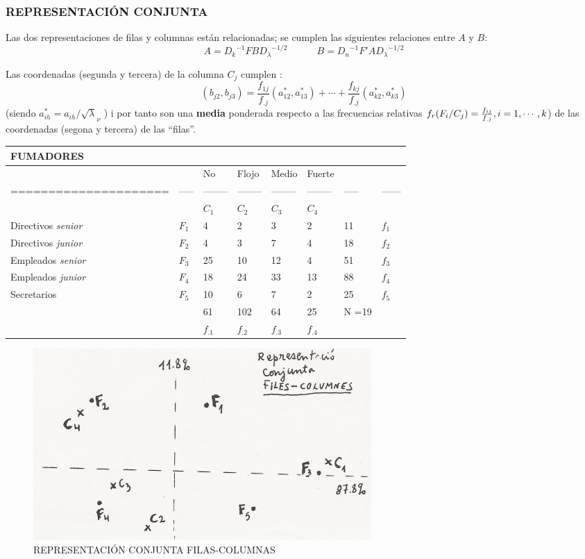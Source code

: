 \documentclass[
]{article}
\begin{document}
\hypertarget{representaciuxf3n-conjunta}{%
\subsubsection{REPRESENTACIÓN
CONJUNTA}\label{representaciuxf3n-conjunta}}

Las dos representaciones de filas y columnas están relacionadas; se
cumplen las siguientes relaciones entre \(A\) y \(B\): \[
A = {D_k}^{-1} F B {D_\lambda}^{-1/2} \qquad \quad B = {D_n}^{-1} F' A {D_\lambda}^{-1/2}
\]

Las coordenadas (segunda y tercera) de la columna \(C_j\) cumplen : \[
(b_{j2},b_{j3}) = \frac{f_{1j}}{f_{.j}} ({a}_{12}^*,{a}_{13}^*) + \cdots + \frac{f_{kj}}{f_{.j}} ({a}_{k2}^*,{a}_{k3}^*)
\] (siendo \({a}_{ih}^* = {a}_{ih} / \sqrt\lambda_{\nu}\) ) i por tanto
son una \textbf{media} ponderada respecto a las frecuencias relativas
\(f_r (F_i / C_j) = \frac{f_{ij}}{f_{.j}}, \space i = 1,\cdots,k\)) de
las coordenadas (segona y tercera) de las ``filas''.

\begin{longtable}[]{@{}llllllll@{}}
\toprule
FUMADORES & & & & & & &\tabularnewline
\midrule
\endhead
& & No & Flojo & Medio & Fuerte & &\tabularnewline
===================== & ----- & -------- & -------- & -------- &
-------- & ----- & ------\tabularnewline
& & \(C_1\) & \(C_2\) & \(C_3\) & \(C_4\) & &\tabularnewline
Directivos \emph{senior} & \(F_1\) & 4 & 2 & 3 & 2 & 11 &
\(f_1\)\tabularnewline
Directivos \emph{junior} & \(F_2\) & 4 & 3 & 7 & 4 & 18 &
\(f_2\)\tabularnewline
Empleados \emph{senior} & \(F_3\) & 25 & 10 & 12 & 4 & 51 &
\(f_3\)\tabularnewline
Empleados \emph{junior} & \(F_4\) & 18 & 24 & 33 & 13 & 88 &
\(f_4\)\tabularnewline
Secretarios & \(F_5\) & 10 & 6 & 7 & 2 & 25 & \(f_5\)\tabularnewline
& & 61 & 102 & 64 & 25 & N =19 &\tabularnewline
& & \(f_{.1}\) & \(f_{.2}\) & \(f_{.3}\) & \(f_{.4}\) & &\tabularnewline
\bottomrule
\end{longtable}

\begin{figure}
\centering
\includegraphics{filcol.png}
\caption{REPRESENTACIÓN CONJUNTA FILAS-COLUMNAS}
\end{figure}
\end{document}
